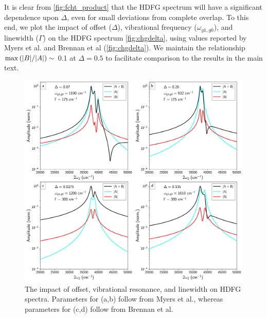 \documentclass[aip, jcp, reprint, onecolumn, nofootinbib]{revtex4-2}
\begin{document}
It is clear from \autoref{fig:fcht_product} that the HDFG spectrum will have a significant dependence upon $\Delta$, even for small deviations from complete overlap. 
To this end, we plot the impact of offset ($\Delta$), vibrational frequency ($\omega_{g1,g0}$), and linewidth ($\Gamma$) on the HDFG spectrum \autoref{fig:chgdelta}, using values reported by Myers et al. and Brennan et al (\autoref{fig:chgdelta}). \cite{Myers1982, Brennan2024}
We maintain the relationship $\max \left(\abs{B}/\abs{A}\right) \sim$ 0.1 at $\Delta = 0.5$ to facilitate comparison to the results in the main text.

\begin{figure}[!htbp]
	\centering
	\includegraphics[width=6.675in]{figures/changedelta.png}
	\caption{The impact of offset, vibrational resonance, and linewidth on HDFG spectra. Parameters for (a,b) follow from Myers et al., whereas parameters for (c,d) follow from Brennan et al.\cite{Myers1982, Brennan2024}
} 
	\label{fig:chgdelta}
\end{figure}
\end{document}
